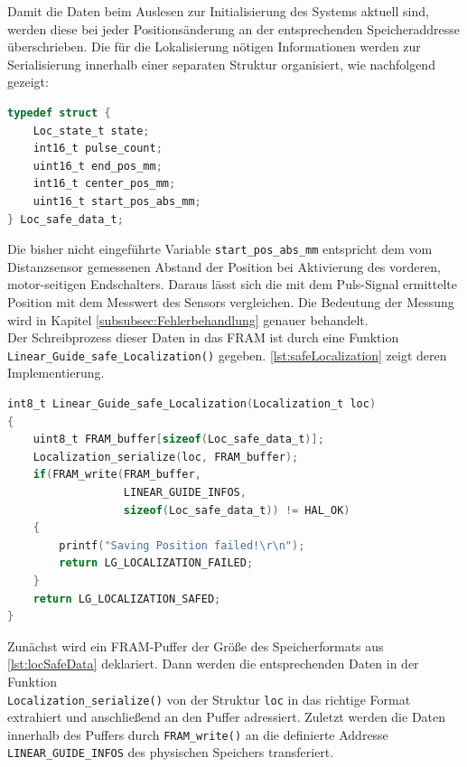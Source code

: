 \noindent
Damit die Daten beim Auslesen zur Initialisierung des Systems aktuell sind, werden diese bei jeder Positionsänderung an der entsprechenden Speicheraddresse überschrieben. Die für die Lokalisierung nötigen Informationen werden zur Serialisierung innerhalb einer separaten Struktur organisiert, wie nachfolgend gezeigt:
\begin{lstlisting}[language=C, caption={Speicherformat der Positionsdaten}, label={lst:locSafeData}]
typedef struct {
	Loc_state_t state;
	int16_t pulse_count;
	uint16_t end_pos_mm;
	int16_t center_pos_mm;
	uint16_t start_pos_abs_mm;
} Loc_safe_data_t;
\end{lstlisting}
Die bisher nicht eingeführte Variable \verb|start_pos_abs_mm| entspricht dem vom Distanzsensor gemessenen Abstand der Position bei Aktivierung des vorderen, motor-seitigen Endschalters. Daraus lässt sich die mit dem Puls-Signal ermittelte Position mit dem Messwert des Sensors vergleichen. Die Bedeutung der Messung wird in Kapitel \ref{subsubsec:Fehlerbehandlung} genauer behandelt. \\

\noindent
Der Schreibprozess dieser Daten in das FRAM ist durch eine Funktion \\\verb|Linear_Guide_safe_Localization()| gegeben. \autoref{lst:safeLocalization} zeigt deren Implementierung.
\begin{lstlisting}[language=C, caption={FRAM Speichervorgang}, label={lst:safeLocalization}]
int8_t Linear_Guide_safe_Localization(Localization_t loc)
{
	uint8_t FRAM_buffer[sizeof(Loc_safe_data_t)];
	Localization_serialize(loc, FRAM_buffer);
	if(FRAM_write(FRAM_buffer, 
	              LINEAR_GUIDE_INFOS, 
	              sizeof(Loc_safe_data_t)) != HAL_OK)
	{
		printf("Saving Position failed!\r\n");
		return LG_LOCALIZATION_FAILED;
	}
	return LG_LOCALIZATION_SAFED;
}
\end{lstlisting}
Zunächst wird ein FRAM-Puffer der Größe des Speicherformats aus \autoref{lst:locSafeData} deklariert. Dann werden die entsprechenden Daten in der Funktion\\ \verb|Localization_serialize()| von der Struktur \verb|loc| in das richtige Format extrahiert und anschließend an den Puffer adressiert. Zuletzt werden die Daten innerhalb des Puffers durch \verb|FRAM_write()| an die definierte Addresse\\ \verb|LINEAR_GUIDE_INFOS| des physischen Speichers transferiert.\\

